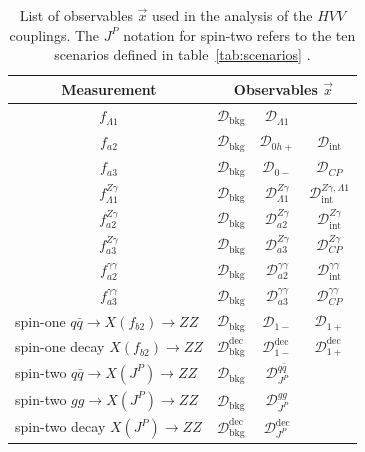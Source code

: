 \begin{table}
\centering
\caption[List of observables $\vec{x}$ used in the analysis of the $HVV$ couplings.
The $J^P$ notation for spin-two refers to the ten scenarios defined in table~\ref{tab:scenarios}.
]{
List of observables $\vec{x}$ used in the analysis of the $HVV$ couplings.
The $J^P$ notation for spin-two refers to the ten scenarios defined in table~\ref{tab:scenarios} \cite{Khachatryan:2014kca}.
}
\label{tab:kdlist}
\begin{tabular}{cccc}
 Measurement  & \multicolumn{3}{c}{Observables $\vec{x}$} \\
\hline
 $f_{\Lambda1}$ & $\mathcal{D}_\text{bkg}$ & $\mathcal{D}_{\Lambda1}$ & \\
 $f_{a2}$ &  $\mathcal{D}_\text{bkg}$ & $\mathcal{D}_{0h+}$ & $\mathcal{D}_\text{int}$ \\
  $f_{a3}$ &  $\mathcal{D}_\text{bkg}$ & $\mathcal{D}_{0-}$ & $\mathcal{D}_{C\!P}$ \\
  $f_{\Lambda1}^{Z\gamma}$ &  $\mathcal{D}_\text{bkg}$ & $\mathcal{D}^{Z\gamma}_{\Lambda1}$  & $\mathcal{D}^{Z\gamma,\Lambda1}_\text{int}$  \\
  $f_{a2}^{Z\gamma}$ &  $\mathcal{D}_\text{bkg}$ & $\mathcal{D}^{Z\gamma}_{a2}$  & $\mathcal{D}_\text{int}^{Z\gamma}$ \\
  $f_{a3}^{Z\gamma}$ &  $\mathcal{D}_\text{bkg}$ & $\mathcal{D}^{Z\gamma}_{a3}$  & $\mathcal{D}_{C\!P}^{Z\gamma}$ \\
 $f_{a2}^{\gamma\gamma}$  &  $\mathcal{D}_\text{bkg}$ & $\mathcal{D}^{\gamma\gamma}_{a2}$  & $\mathcal{D}_\text{int}^{\gamma\gamma}$ \\
  $f_{a3}^{\gamma\gamma}$ & $\mathcal{D}_\text{bkg}$ & $\mathcal{D}^{\gamma\gamma}_{a3}$ & $\mathcal{D}_{C\!P}^{\gamma\gamma}$ \\
 \multicolumn{1}{l}{spin-one $q\bar{q}\to X (f_{b2})\to ZZ$} &  $\mathcal{D}_\text{bkg}$ & $\mathcal{D}_{1-}$ & $\mathcal{D}_{1+}$ \\

 \multicolumn{1}{l}{spin-one decay  $X(f_{b2})\to ZZ$} &  $\mathcal{D}_\text{bkg}^\text{dec}$ & $\mathcal{D}_{1-}^\text{dec}$ & $\mathcal{D}_{1+}^\text{dec}$ \\
 \multicolumn{1}{l}{spin-two $q\bar{q}\to X (J^P)\to ZZ$} &  $\mathcal{D}_\text{bkg}$ & $\mathcal{D}_{J^P}^{q\bar{q}}$ & \\

 \multicolumn{1}{l}{spin-two $gg\to X (J^P)\to ZZ$} &  $\mathcal{D}_\text{bkg}$ & $\mathcal{D}_{J^P}^{gg}$ & \\

 \multicolumn{1}{l}{spin-two decay $X (J^P)\to ZZ$}&  $\mathcal{D}_\text{bkg}^\text{dec}$ & $\mathcal{D}_{J^P}^\text{dec}$ & \\
\end{tabular}

\end{table}

